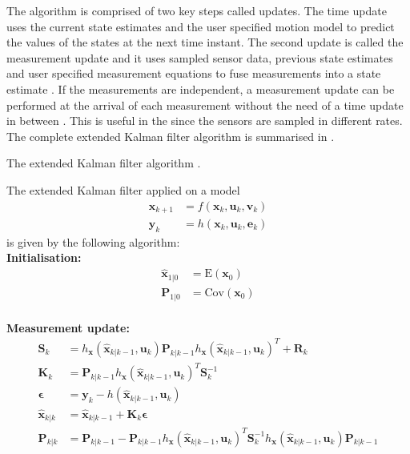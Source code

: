The \abbrEKF algorithm is comprised of two key steps called updates.
The time update uses the current state estimates and the user specified motion model to predict the values of the states at the next time instant. The second update is called the measurement update and it uses sampled sensor data, previous state estimates and user specified measurement equations to fuse measurements into a state estimate \citep{sensorfusion}.
If the measurements are independent, a measurement update can be performed at the arrival of each measurement without the need of a time update in between \citep[p. 170]{sensorfusion}. This is useful in the \abbrROV since the sensors are sampled in different rates.
The complete extended Kalman filter algorithm is summarised in .
\begin{algorithm}
\caption{The extended Kalman filter algorithm \citep{sensorfusion}.}
\label{alg:EKF}
  The extended Kalman filter applied on a model
    \begin{align*}
    \boldsymbol{x}_{k+1} &= f(\boldsymbol{x}_{k},\boldsymbol{u}_{k}, \boldsymbol{v}_{k})\\
    \boldsymbol{y}_{k} &= h(\boldsymbol{x}_{k},\boldsymbol{u}_{k},\boldsymbol{e}_{k})
    \end{align*} is given by the following algorithm:\\
    \textbf{Initialisation:}
    \begin{align*}
    \hat{\boldsymbol{x}}_{1|0} &= \text{E}(\boldsymbol{x}_{0})\\
    \boldsymbol{P}_{1|0} &= \text{Cov}(\boldsymbol{x}_{0})\\
    \end{align*}
     
    \textbf{Measurement update:}
    \begin{align*}
    \boldsymbol{S}_{k} &= h_{\boldsymbol{x}}(\hat{\boldsymbol{x}}_{k|k-1},\boldsymbol{u}_{k}) \boldsymbol{P}_{k|k-1} h_{\boldsymbol{x}}(\hat{\boldsymbol{x}}_{k|k-1},\boldsymbol{u}_{k})^{T} + \boldsymbol{R}_{k}\\
    \boldsymbol{K}_{k} &= \boldsymbol{P}_{k|k-1} h_{\boldsymbol{x}}(\hat{\boldsymbol{x}}_{k|k-1},\boldsymbol{u}_{k})^{T} \boldsymbol{S}_{k}^{-1}\\
    \boldsymbol{\epsilon} &= \boldsymbol{y}_{k} - h(\hat{\boldsymbol{x}}_{k|k-1},\boldsymbol{u}_{k})\\
    \hat{\boldsymbol{x}}_{k|k} &= \hat{\boldsymbol{x}}_{k|k-1} + \boldsymbol{K}_{k}\boldsymbol{\epsilon}\\
    \boldsymbol{P}_{k|k} &= \boldsymbol{P}_{k|k-1} - \boldsymbol{P}_{k|k-1} h_{\boldsymbol{x}}(\hat{\boldsymbol{x}}_{k|k-1},\boldsymbol{u}_{k})^{T} \boldsymbol{S}_{k}^{-1} h_{\boldsymbol{x}}(\hat{\boldsymbol{x}}_{k|k-1},\boldsymbol{u}_{k}) \boldsymbol{P}_{k|k-1}\\
    \end{align*}
    

\end{algorithm}
